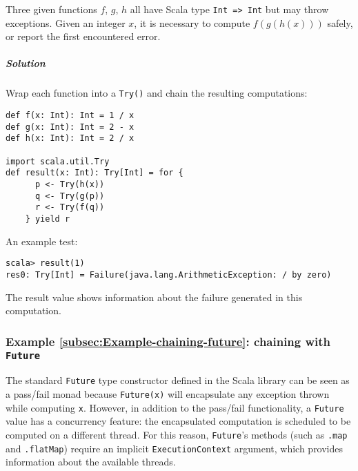 Three given functions $f$, $g$, $h$ all have Scala type \lstinline!Int => Int!
but may throw exceptions. Given an integer $x$, it is necessary to
compute $f(g(h(x)))$ safely, or report the first encountered error.

\subparagraph{Solution}

Wrap each function into a \lstinline!Try()! and chain the resulting
computations:
\begin{lstlisting}
def f(x: Int): Int = 1 / x
def g(x: Int): Int = 2 - x
def h(x: Int): Int = 2 / x

import scala.util.Try
def result(x: Int): Try[Int] = for {
      p <- Try(h(x))
      q <- Try(g(p))
      r <- Try(f(q))
    } yield r
\end{lstlisting}

An example test:
\begin{lstlisting}
scala> result(1)
res0: Try[Int] = Failure(java.lang.ArithmeticException: / by zero)
\end{lstlisting}
The result value shows information about the failure generated in
this computation.

\subsubsection{Example \label{subsec:Example-chaining-future}\ref{subsec:Example-chaining-future}:
chaining with \texttt{Future}}

The standard \lstinline!Future! type constructor defined in the Scala
library can be seen as a pass/fail monad because \lstinline!Future(x)!
will encapsulate any exception thrown while computing \lstinline!x!.
However, in addition to the pass/fail functionality, a \lstinline!Future!
value has a concurrency feature: the encapsulated computation is scheduled
to be computed on a different thread. For this reason, \lstinline!Future!\textsf{'}s
methods (such as \lstinline!.map! and \lstinline!.flatMap!) require
an implicit \lstinline!ExecutionContext! argument, which provides
information about the available threads.

